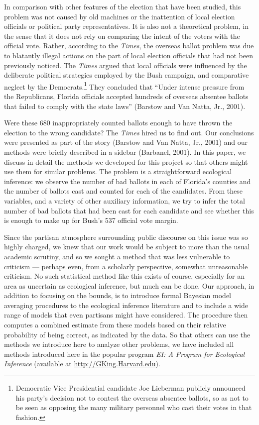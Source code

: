 \documentclass[11pt,titlepage]{article}
\begin{document}
In comparison with other features of the election that have been
studied, this problem was not caused by old machines or the
inattention of local election officials or political party
representatives.  It is also not a theoretical problem, in the sense
that it does not rely on comparing the intent of the voters with the
official vote.  Rather, according to the \emph{Times}, the overseas
ballot problem was due to blatantly illegal actions on the part of
local election officials that had not been previously noticed.  The
\emph{Times} argued that local officials were influenced by the
deliberate political strategies employed by the Bush campaign, and
comparative neglect by the Democrats.\footnote{Democratic Vice
  Presidential candidate Joe Lieberman publicly announced his party's
  decision not to contest the overseas absentee ballots, so as not to
  be seen as opposing the many military personnel who cast their votes
  in that fashion.}  They concluded that ``Under intense pressure from
the Republicans, Florida officials accepted hundreds of overseas
absentee ballots that failed to comply with the state laws'' (Barstow
and Van Natta, Jr., 2001)\nocite{BarVan01}.

Were these 680 inappropriately counted ballots enough to have thrown
the election to the wrong candidate?  The \emph{Times} hired us to
find out.  Our conclusions were presented as part of the story
(Barstow and Van Natta, Jr., 2001) and our methods were briefly
described in a sidebar (Barbanel, 2001)\nocite{Barbanel01}.  In this
paper, we discuss in detail the methods we developed for this project
so that others might use them for similar problems.  The problem is a
straightforward ecological inference: we observe the number of bad
ballots in each of Florida's counties and the number of ballots cast
and counted for each of the candidates.  From these variables, and a
variety of other auxiliary information, we try to infer the total
number of bad ballots that had been cast for each candidate and see
whether this is enough to make up for Bush's 537 official vote margin.

Since the partisan atmosphere surrounding public discourse on this
issue was so highly charged, we knew that our work would be subject to
more than the usual academic scrutiny, and so we sought a method that
was less vulnerable to criticism --- perhaps even, from a scholarly
perspective, somewhat unreasonable criticism.  No such statistical
method like this exists of course, especially for an area as uncertain
as ecological inference, but much can be done.  Our approach, in
addition to focusing on the bounds, is to introduce formal Bayesian
model averaging procedures to the ecological inference literature and
to include a wide range of models that even partisans might have
considered.  The procedure then computes a combined estimate from
these models based on their relative probability of being correct, as
indicated by the data.  So that others can use the methods we
introduce here to analyze other problems, we have included all methods
introduced here in the popular program \emph{EI: A Program for
  Ecological Inference} (available at \url{http://GKing.Harvard.edu}).
\end{document}
